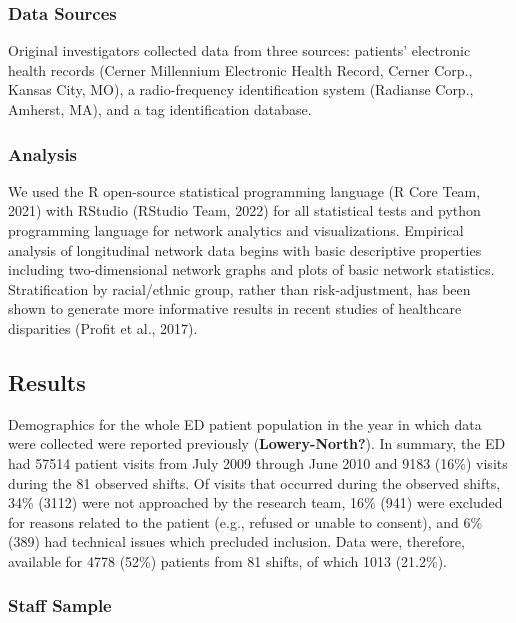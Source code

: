\documentclass[
]{article}
\begin{document}
\hypertarget{data-sources}{%
\subsubsection{Data Sources}\label{data-sources}}

Original investigators collected data from three sources: patients'
electronic health records (Cerner Millennium Electronic Health Record,
Cerner Corp., Kansas City, MO), a radio-frequency identification system
(Radianse Corp., Amherst, MA), and a tag identification database.

\hypertarget{analysis}{%
\subsubsection{Analysis}\label{analysis}}

We used the R open-source statistical programming language (R Core Team,
2021) with RStudio (RStudio Team, 2022) for all statistical tests and
python programming language for network analytics and visualizations.
Empirical analysis of longitudinal network data begins with basic
descriptive properties including two-dimensional network graphs and
plots of basic network statistics. Stratification by racial/ethnic
group, rather than risk-adjustment, has been shown to generate more
informative results in recent studies of healthcare disparities (Profit
et al., 2017).

\hypertarget{results}{%
\subsection{Results}\label{results}}

Demographics for the whole ED patient population in the year in which
data were collected were reported previously (\textbf{Lowery-North?}).
In summary, the ED had 57514 patient visits from July 2009 through June
2010 and 9183 (16\%) visits during the 81 observed shifts. Of visits
that occurred during the observed shifts, 34\% (3112) were not
approached by the research team, 16\% (941) were excluded for reasons
related to the patient (e.g., refused or unable to consent), and 6\%
(389) had technical issues which precluded inclusion. Data were,
therefore, available for 4778 (52\%) patients from 81 shifts, of which
1013 (21.2\%).

\hypertarget{staff-sample}{%
\subsubsection{Staff Sample}\label{staff-sample}}
\end{document}
